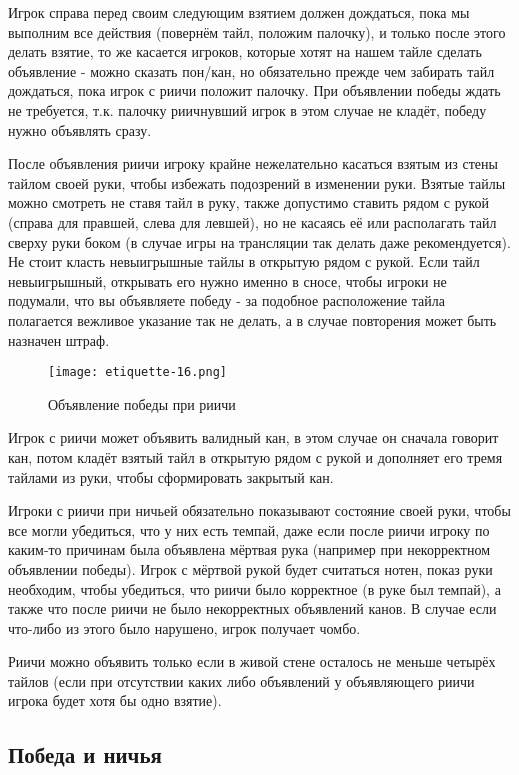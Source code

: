 Игрок справа перед своим следующим взятием должен дождаться, пока мы выполним все действия (повернём тайл, положим палочку), и только после этого делать взятие, то же касается игроков, которые хотят на нашем тайле сделать объявление - можно сказать пон/кан, но обязательно прежде чем забирать тайл дождаться, пока игрок с риичи положит палочку. При объявлении победы ждать не требуется, т.к. палочку риичнувший игрок в этом случае не кладёт, победу нужно объявлять сразу.

После объявления риичи игроку крайне нежелательно касаться взятым из стены тайлом своей руки, чтобы избежать подозрений в изменении руки. Взятые тайлы можно смотреть не ставя тайл в руку, также допустимо ставить рядом с рукой (справа для правшей, слева для левшей), но не касаясь её или располагать тайл сверху руки боком (в случае игры на трансляции так делать даже рекомендуется). Не стоит класть невыигрышные тайлы в открытую рядом с рукой. Если тайл невыигрышный, открывать его нужно именно в сносе, чтобы игроки не подумали, что вы объявляете победу - за подобное расположение тайла полагается вежливое указание так не делать, а в случае повторения может быть назначен штраф.

\begin{figure}[H]
	\centering
	\texttt{[image: etiquette-16.png]}
	\caption{Объявление победы при риичи}
\end{figure}

Игрок с риичи может объявить валидный кан, в этом случае он сначала говорит кан, потом кладёт взятый тайл в открытую рядом с рукой и дополняет его тремя тайлами из руки, чтобы сформировать закрытый кан.

Игроки с риичи при ничьей обязательно показывают состояние своей руки, чтобы все могли убедиться, что у них есть темпай, даже если после риичи игроку по каким-то причинам была объявлена мёртвая рука (например при некорректном объявлении победы). Игрок с мёртвой рукой будет считаться нотен, показ руки необходим, чтобы убедиться, что риичи было корректное (в руке был темпай), а также что после риичи не было некорректных объявлений канов. В случае если что-либо из этого было нарушено, игрок получает чомбо.

Риичи можно объявить только если в живой стене осталось не меньше четырёх тайлов (если при отсутствии каких либо объявлений у объявляющего риичи игрока будет хотя бы одно взятие). 

\subsection{Победа и ничья}

